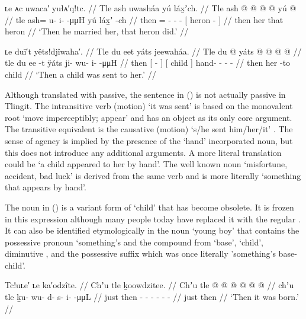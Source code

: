 \ex\label{ex:91-139-then-married-her}%
%
\begingl
	\glpreamble	ʟe ᴀc uwaca′ yułᴀ′q!tc. //
	\glpreamble	Tle ash uwasháa yú láx̱ʼch. //
	\gla	Tle ash @  @ {} @ {} @ {}
		{} yú  @ {} {} //
	\glb	tle ash= u- i-  -μμH
		{} yú láx̱ʼ -ch {} //
	\glc	then = - -  -
		{}[  heron - {}] //
	\gld	then her  {} {} {}
		{} that heron {} {} //
	\glft	‘Then he married her, that heron did.’
		//
\endgl
\xe

\ex\label{ex:91-140-child-sent-to-her}%
%
\begingl
	\glpreamble	ʟe duī′t yêts!djîwaha′. //
	\glpreamble	Tle du eet yáts jeewaháa. //
	\gla	Tle {} du  @ {} {} {} yáts {}
		 @ {} @ {} @ {} @ {} //
	\glb	tle {} du ee -t {} {} ÿáts {}
		ji- wu- i-  -μμH //
	\glc	then {}[   - {}] {}[ child {}]
		hand- - -  - //
	\gld	then {} her {} -to {} {} child {}
		 {} {} {} {} //
	\glft	‘Then a child was sent to her.’
		//
\endgl
\xe

Although translated with passive, the sentence in (\lastx) is not actually passive in Tlingit.
The intransitive verb  (motion) ‘it was sent’ is based on the monovalent root  ‘move imperceptibly; appear’ and has an object as its only core argument.
The transitive equivalent is the causative  (motion) ‘s/he sent him/her/it’ \parencite[10]{leer:1976}.
The sense of agency is implied by the presence of the  ‘hand’ incorporated noun, but this does not introduce any additional arguments.
A more literal translation could be ‘a child appeared to her by hand’.
The well known noun  ‘misfortune, accident, bad luck’ is derived from the same verb and is more literally ‘something that appears by hand’.

The noun  in (\lastx) is a variant form of  ‘child’ that has become obsolete.
It is frozen in this expression although many people today have replaced it with the regular .
It can also be identified etymologically in the noun  ‘young boy’ that contains the possessive pronoun  ‘something’s and the compound  from  ‘base’,  ‘child’, diminutive , and the possessive suffix  which was once literally ’something’s base-child’.

\ex\label{ex:91-141-it-was-born}%
%
\begingl
	\glpreamble	Tc!uʟe′ ʟe ka′odzîte. //
	\glpreamble	Chʼu tle ḵoowdzitee. //
	\gla	Chʼu tle  @ {} @ {} @ {} @ {} @ {} @ {} //
	\glb	chʼu tle ḵu- wu- d- s- i-  -μμL //
	\glc	just then - - - - -
			 - //
	\gld	just then  {} {} {} {} {} {} //
	\glft	‘Then it was born.’
		//
\endgl
\xe

